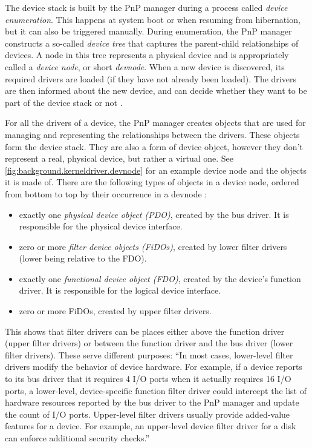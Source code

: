 The device stack is built by the PnP manager during a process called \emph{device enumeration}. This happens at system boot or when resuming from hibernation, but it can also be triggered manually. During enumeration, the PnP manager constructs a so-called \emph{device tree} that captures the parent-child relationships of devices. A node in this tree represents a physical device and is appropriately called a \emph{device node}, or short \emph{devnode}. When a new device is discovered, its required drivers are loaded (if they have not already been loaded). The drivers are then informed about the new device, and can decide whether they want to be part of the device stack or not \cite{Yosifovich2017}.

For all the drivers of a device, the PnP manager creates objects that are used for managing and representing the relationships between the drivers. These objects form the device stack. They are also a form of device object, however they don't represent a real, physical device, but rather a virtual one. See \autoref{fig:background.kerneldriver.devnode} for an example device node and the objects it is made of. There are the following types of objects in a device node, ordered from bottom to top by their occurrence in a devnode \cite{Yosifovich2017}:
\begin{itemize}
	\item exactly one \emph{physical device object (PDO)}, created by the bus driver. It is responsible for the physical device interface.
	\item zero or more \emph{filter device objects (FiDOs)}, created by lower filter drivers (lower being relative to the FDO).
	\item exactly one \emph{functional device object (FDO)}, created by the device's function driver. It is responsible for the logical device interface.
	\item zero or more FiDOs, created by upper filter drivers.
\end{itemize}

This shows that filter drivers can be places either above the function driver (upper filter drivers) or between the function driver and the bus driver (lower filter drivers). These serve different purposes: ``In most cases, lower-level filter drivers modify the behavior of device hardware. For example, if a device reports to its bus driver that it requires 4 I/O ports when it actually requires 16 I/O ports, a lower-level, device-specific function filter driver could intercept the list of hardware resources reported by the bus driver to the PnP manager and update the count of I/O ports. Upper-level filter drivers usually provide added-value features for a device. For example, an upper-level device filter driver for a disk can enforce additional security checks.'' \cite{Yosifovich2017}

